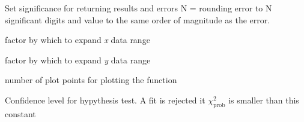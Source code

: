 \documentclass[letterpaper,10pt,english]{sphinxmanual}
\begin{document}
\begin{fulllineitems}
\label{api/kafe:kafe.constants.F_SIGNIFICANCE}
Set significance for returning results and errors
N = rounding error to N significant digits and value
to the same order of magnitude as the error.

\end{fulllineitems}


\begin{fulllineitems}
\label{api/kafe:kafe.constants.G_PADDING_FACTOR_X}
factor by which to expand \emph{x} data range

\end{fulllineitems}


\begin{fulllineitems}
\label{api/kafe:kafe.constants.G_PADDING_FACTOR_Y}
factor by which to expand \emph{y} data range

\end{fulllineitems}


\begin{fulllineitems}
\label{api/kafe:kafe.constants.G_PLOT_POINTS}
number of plot points for plotting the function

\end{fulllineitems}


\begin{fulllineitems}
\label{api/kafe:kafe.constants.M_CONFIDENCE_LEVEL}
Confidence level for hypythesis test. A fit is rejected it $\chi^2_\text{prob}$ is smaller than this constant

\end{fulllineitems}

\end{document}
